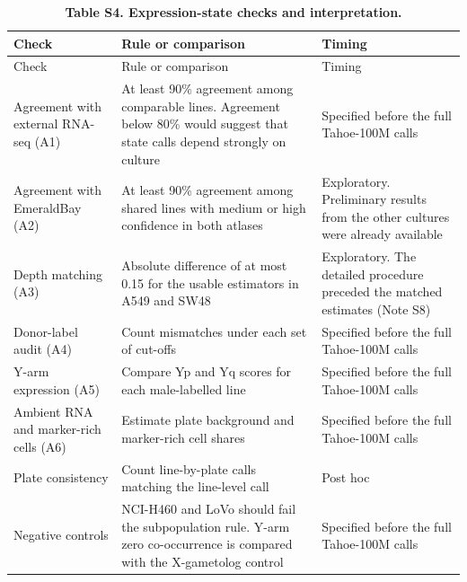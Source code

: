 \documentclass[
  11pt,
  letterpaper,
]{article}
\begin{document}
\begin{longtable}[]{@{}
  >{\raggedright\arraybackslash}p{}
  >{\raggedright\arraybackslash}p{}
  >{\raggedright\arraybackslash}p{}@{}}
\caption{\textbf{Table S4. Expression-state checks and
interpretation.}}\tabularnewline
\toprule\noalign{}
\begin{minipage}[b]{\linewidth}\raggedright
Check
\end{minipage} & \begin{minipage}[b]{\linewidth}\raggedright
Rule or comparison
\end{minipage} & \begin{minipage}[b]{\linewidth}\raggedright
Timing
\end{minipage} \\
\midrule\noalign{}
\endfirsthead
\toprule\noalign{}
\begin{minipage}[b]{\linewidth}\raggedright
Check
\end{minipage} & \begin{minipage}[b]{\linewidth}\raggedright
Rule or comparison
\end{minipage} & \begin{minipage}[b]{\linewidth}\raggedright
Timing
\end{minipage} \\
\midrule\noalign{}
\endhead
\bottomrule\noalign{}
\endlastfoot
Agreement with external RNA-seq (A1) & At least 90\% agreement among
comparable lines. Agreement below 80\% would suggest that state calls
depend strongly on culture & Specified before the full Tahoe-100M
calls \\
Agreement with EmeraldBay (A2) & At least 90\% agreement among shared
lines with medium or high confidence in both atlases & Exploratory.
Preliminary results from the other cultures were already available \\
Depth matching (A3) & Absolute difference of at most 0.15 for the usable
estimators in A549 and SW48 & Exploratory. The detailed procedure
preceded the matched estimates (Note S8) \\
Donor-label audit (A4) & Count mismatches under each set of cut-offs &
Specified before the full Tahoe-100M calls \\
Y-arm expression (A5) & Compare Yp and Yq scores for each male-labelled
line & Specified before the full Tahoe-100M calls \\
Ambient RNA and marker-rich cells (A6) & Estimate plate background and
marker-rich cell shares & Specified before the full Tahoe-100M calls \\
Plate consistency & Count line-by-plate calls matching the line-level
call & Post hoc \\
Negative controls & NCI-H460 and LoVo should fail the subpopulation
rule. Y-arm zero co-occurrence is compared with the X-gametolog control
& Specified before the full Tahoe-100M calls \\
\end{longtable}
\end{document}
